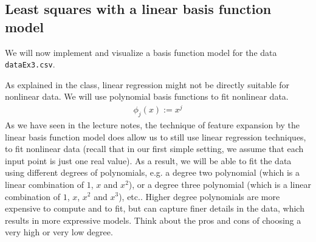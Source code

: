 \documentclass{../tex_import/ETHuebung_english}
\begin{document}

\subsection{Least squares with a linear basis function model}
We will now implement and visualize a basis function model for the data {\tt dataEx3.csv}.
\newline

As explained in the class, linear regression might not be directly suitable for nonlinear data.
We will use polynomial basis functions to fit nonlinear data.
\begin{align}
\phi_j(x) := x^j
\end{align}
As we have seen in the lecture notes, the technique of feature expansion by the linear basis function model does allow us to still use linear regression techniques, to fit nonlinear data (recall that in our first simple setting, we assume that each input point is just one real value).
As a result, we will be able to fit the data using different degrees of polynomials,
e.g. a degree two polynomial (which is a linear combination of $1$, $x$ and $x^2$),
or a degree three polynomial (which is a linear combination of $1$, $x$, $x^2$ and $x^3$), etc..
Higher degree polynomials are more expensive to compute and to fit, but can capture finer details in the data, which results in more expressive models.
Think about the pros and cons of choosing a very high or very low degree.
\newline
\end{document}
